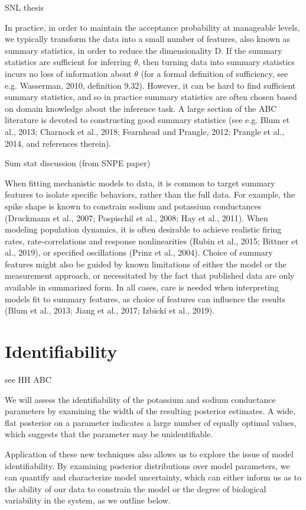 SNL thesis

In practice, in order to maintain the acceptance probability at manageable levels, we typically transform the data into a small number of features, also known as summary statistics, in order to reduce the dimensionality D. If the summary statistics are sufficient for inferring $\theta$, then turning data into summary statistics incurs no loss of information about $\theta$ (for a formal definition of sufficiency, see e.g. Wasserman, 2010, definition 9.32). However, it can be hard to find sufficient summary statistics, and so in practice summary statistics are often chosen based on domain knowledge about the inference task. A large section of the ABC literature is devoted to constructing good summary statistics (see e.g. Blum et al., 2013; Charnock et al., 2018; Fearnhead and Prangle, 2012; Prangle et al., 2014, and references therein).

Sum stat discussion (from SNPE paper)

When fitting mechanistic models to data, it is common to target summary features to isolate specific behaviors, rather than the full data. For example, the spike shape is known to constrain sodium and potassium conductances (Druckmann et al., 2007; Pospischil et al., 2008; Hay et al., 2011). When modeling population dynamics, it is often desirable to achieve realistic firing rates, rate-correlations and response nonlinearities (Rubin et al., 2015; Bittner et al., 2019), or specified oscillations (Prinz et al., 2004). Choice of summary features might also be guided by known limitations of either the model or the measurement approach, or necessitated by the fact that published data are only available in summarized form.  In all cases, care is needed when interpreting models fit to summary features, as choice of features can influence the results (Blum et al., 2013; Jiang et al., 2017; Izbicki et al., 2019).


\section{Identifiability} 

see HH ABC 

We will assess the identifiability of the potassium and sodium conductance parameters by examining the width of the resulting posterior estimates. A wide, flat posterior on a parameter indicates a large number of equally optimal values, which suggests that the parameter may be unidentifiable.

Application of these new techniques also allows us to explore the issue of model identifiability. By examining posterior distributions over model parameters, we can quantify and characterize model uncertainty, which can either inform us as to the ability of our data to constrain the model or the degree of biological variability in the system, as we outline below.

